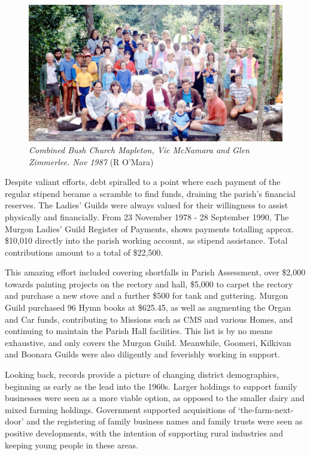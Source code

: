\begin{figure}[!htb]
\begin{center}
\includegraphics[width=1.\textwidth,center]{../images/bushChuchMapleton1987.jpg}
\caption{{\itshape Combined Bush Church Mapleton, Vic McNamara and Glen Zimmerlee. Nov 1987} {\scriptsize(R O'Mara)}}
\end{center}
\end{figure}




Despite valiant efforts, debt spiralled to a point where each payment of the regular stipend became a scramble to find funds, draining the parish's financial reserves. The Ladies' Guilds were always valued for their willingness to assist physically and financially. From 23 November 1978 - 28 September 1990, The Murgon Ladies' Guild Register of Payments, shows payments totalling approx. \$10,010 directly into the parish working account, as stipend assistance. Total contributions amount to a total of \$22,500.



This amazing effort included covering shortfalls in Parish Assessment, over \$2,000 towards painting projects on the rectory and hall, \$5,000 to carpet the rectory and purchase a new stove and a further \$500 for tank and guttering. Murgon Guild purchased 96 Hymn books at \$625.45, as well as augmenting the Organ and Car funds, contributing to Missions such as CMS and various Homes, and continuing to maintain the Parish Hall facilities. This list is by no means exhaustive, and only covers the Murgon Guild. Meanwhile, Goomeri, Kilkivan and Boonara Guilds were also diligently and feverishly working in support.



Looking back, records provide a picture of changing district demographics, beginning as early as the lead into the 1960s. Larger holdings to support family businesses were seen as a more viable option, as opposed to the smaller dairy and mixed farming holdings. Government supported acquisitions of `the-farm-next-door' and the registering of family business names and family trusts were seen as positive developments, with the intention of supporting rural industries and keeping young people in these areas.



